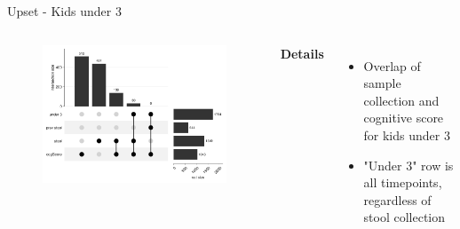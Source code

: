 \begin{frame}{Upset - Kids under 3}
    \begin{columns}[c] %

    
        \begin{figure}
        \includegraphics[width=1\linewidth]{../figures/upset_score_stool_under3.png}
        \end{figure}

    
        \textbf{Details}
        \begin{itemize}
            \item Overlap of sample collection and cognitive score for kids under 3
            \item "Under 3" row is all timepoints, regardless of stool collection
        \end{itemize}

    \end{columns}

\end{frame}

